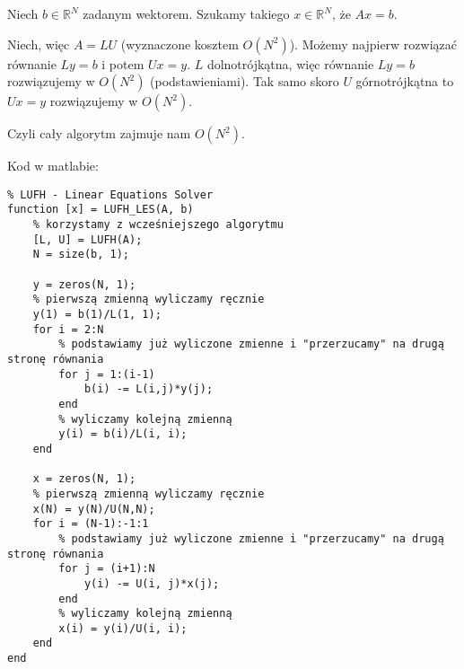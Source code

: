 \documentclass{article}
\begin{document}
Niech $b \in \mathbb{R}^N$ zadanym wektorem. \newline
Szukamy takiego $x \in \mathbb{R}^N$, że $Ax=b$. \newline

Niech, więc $A=LU$ (wyznaczone kosztem $O(N^2)$). \newline
Możemy najpierw rozwiązać równanie $Ly=b$ i potem $Ux = y$. \newline
$L$ dolnotrójkątna, więc równanie $Ly=b$ rozwiązujemy w $O(N^2)$ (podstawieniami). \newline
Tak samo skoro $U$ górnotrójkątna to $Ux=y$ rozwiązujemy w $O(N^2)$.

Czyli cały algorytm zajmuje nam $O(N^2)$.

Kod w matlabie:

\begin{verbatim}
% LUFH - Linear Equations Solver
function [x] = LUFH_LES(A, b)
    % korzystamy z wcześniejszego algorytmu
    [L, U] = LUFH(A);
    N = size(b, 1);

    y = zeros(N, 1);
    % pierwszą zmienną wyliczamy ręcznie
    y(1) = b(1)/L(1, 1);
    for i = 2:N
        % podstawiamy już wyliczone zmienne i "przerzucamy" na drugą stronę równania
        for j = 1:(i-1)
            b(i) -= L(i,j)*y(j);
        end
        % wyliczamy kolejną zmienną
        y(i) = b(i)/L(i, i);
    end

    x = zeros(N, 1);
    % pierwszą zmienną wyliczamy ręcznie
    x(N) = y(N)/U(N,N);
    for i = (N-1):-1:1
        % podstawiamy już wyliczone zmienne i "przerzucamy" na drugą stronę równania
        for j = (i+1):N
            y(i) -= U(i, j)*x(j);
        end
        % wyliczamy kolejną zmienną
        x(i) = y(i)/U(i, i);
    end
end
\end{verbatim}
\end{document}

